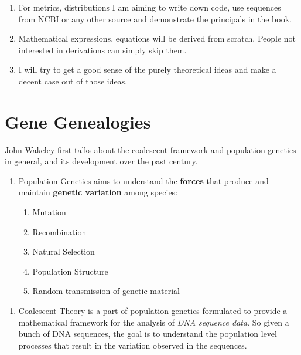 \documentclass[
]{book}
\providecommand{\tightlist}{%
  \setlength{\itemsep}{0pt}\setlength{\parskip}{0pt}}
\theoremstyle{definition}
\theoremstyle{definition}
\theoremstyle{definition}
\theoremstyle{definition}
\theoremstyle{remark}
\begin{document}
\begin{enumerate}
\def\labelenumi{\arabic{enumi}.}
\item
  For metrics, distributions I am aiming to write down code, use sequences from NCBI or any other source and demonstrate the principals in the book.
\item
  Mathematical expressions, equations will be derived from scratch. People not interested in derivations can simply skip them.
\item
  I will try to get a good sense of the purely theoretical ideas and make a decent case out of those ideas.
\end{enumerate}

\hypertarget{gene-genealogies}{%
\chapter{Gene Genealogies}\label{gene-genealogies}}

John Wakeley first talks about the coalescent framework and population genetics in general, and its development over the past century.

\begin{enumerate}
\def\labelenumi{\arabic{enumi}.}
\tightlist
\item
  Population Genetics aims to understand the \textbf{forces} that produce and maintain \textbf{genetic variation} among species:

  \begin{enumerate}
  \def\labelenumii{\alph{enumii}.}
  \tightlist
  \item
    Mutation
  \item
    Recombination
  \item
    Natural Selection
  \item
    Population Structure
  \item
    Random transmission of genetic material
  \end{enumerate}
\end{enumerate}

\begin{enumerate}
\def\labelenumi{\arabic{enumi}.}
\setcounter{enumi}{1}
\tightlist
\item
  Coalescent Theory is a part of population genetics formulated to provide a mathematical framework for the analysis of \emph{DNA sequence data}. So given a bunch of DNA sequences, the goal is to understand the population level processes that result in the variation observed in the sequences.
\end{enumerate}
\end{document}
